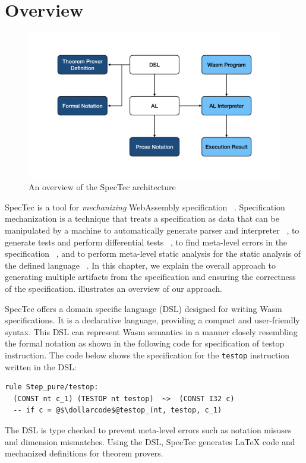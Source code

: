 
\chapter{Overview}
\label{ch:overview}
\noindent


\begin{figure}[t]
  \centerline{\includegraphics[width=15cm]{fig/overview}}
  \caption[An overview of the SpecTec architecture]
    {An overview of the SpecTec architecture}
    \label{fig:overview}
\end{figure}

SpecTec is a tool for \textit{mechanizing} WebAssembly specification
~\cite{spectec}.
Specification mechanization is a technique that treats a specification as data
that can be manipulated by a machine to automatically generate parser and
interpreter ~\cite{jiset}, to generate tests and perform differential tests
~\cite{jest}, to find meta-level errors in the specification ~\cite{jstar}, and
to perform meta-level static analysis for the static analysis of the defined
language ~\cite{jsaver}.
In this chapter, we explain the overall approach to generating multiple
artifacts from the specification and ensuring the correctness of the
specification.
 illustrates an overview of our approach.


SpecTec offers a domain specific language (DSL) designed for writing
Wasm specifications.
It is a declarative language, providing a compact and user-friendly syntax.
This DSL can represent Wasm semantics in a manner closely resembling the formal
notation as shown in the following code for specification of testop
instruction.
The code below shows the specification for the \texttt{testop} instruction
written in the DSL:
\begin{lstlisting}[style=dsl]
  rule Step_pure/testop:
  (CONST nt c_1) (TESTOP nt testop)  ~>  (CONST I32 c)
  -- if c = @$\dollarcode$@testop_(nt, testop, c_1)
\end{lstlisting}
The DSL is type checked to prevent meta-level errors such as notation misuses and
dimension mismatches.
Using the DSL, SpecTec generates LaTeX code and mechanized definitions for theorem provers.


